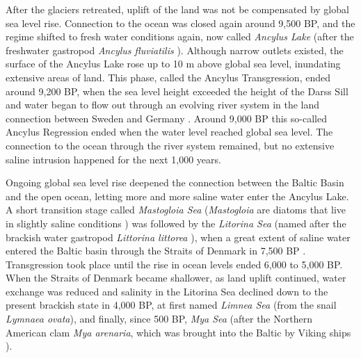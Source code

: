 After the glaciers retreated, uplift of the land was not be compensated by global sea level rise. Connection to the ocean was closed again around 9,500 BP, and the regime shifted to fresh water conditions again, now called \textit{Ancylus Lake} (after the freshwater gastropod \textit{Ancylus fluviatilis} \citep[][]{tikkanen2002}). Although narrow outlets existed, the surface of the Ancylus Lake rose up to 10 m above global sea level, inundating extensive areas of land. This phase, called the Ancylus Transgression, ended around 9,200 BP, when the sea level height exceeded the height of the Darss Sill and water began to flow out through an evolving river system in the land connection between Sweden and Germany \citep[][]{tikkanen2002}. Around 9,000 BP this so-called Ancylus Regression ended when the water level reached global sea level. The connection to the ocean through the river system remained, but no extensive saline intrusion happened for the next 1,000 years.

Ongoing global sea level rise deepened the connection between the Baltic Basin 
and the open ocean, letting more and more saline water enter the Ancylus Lake. A 
short transition stage called \textit{Mastogloia Sea} (\textit{Mastogloia} are 
diatoms that live in slightly saline conditions \citep[][]{eronen2001}) was 
followed by the \textit{Litorina Sea} (named after the brackish water gastropod 
\textit{Littorina littorea} \citep[][]{eronen2001}), when a great extent of 
saline water entered the Baltic basin through the Straits of Denmark in 7,500 BP 
\citep[][]{bjoerk95}. Transgression took place until the rise in ocean levels 
ended 6,000 to 5,000 BP. When the Straits of Denmark became shallower, as land 
uplift continued, water exchange was reduced and salinity in the Litorina Sea 
declined down to the present brackish state in 4,000 BP, at first named 
\textit{Limnea Sea} (from the snail \textit{Lymnaea ovata}), and finally, since 
500 BP, \textit{Mya Sea} (after the Northern American clam \textit{Mya 
arenaria}, which was brought into the Baltic by Viking ships 
\citep[][]{bjoerck2008}).

